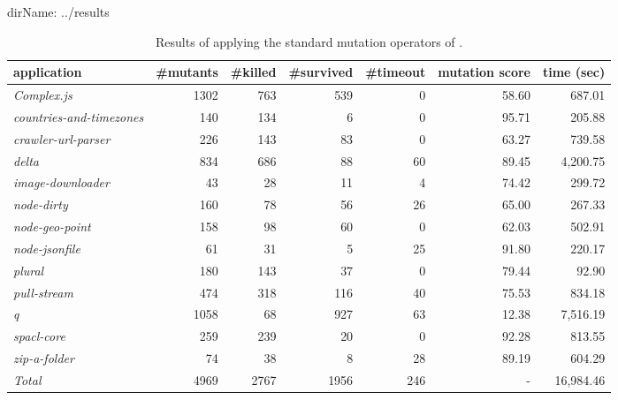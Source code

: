 dirName: ../results
\begin{table*}
 \centering
 {\scriptsize
 \begin{tabular}{l||r|r|r|r|r|r}
   {\bf application} & {\bf \#mutants} & {\bf \#killed} & {\bf \#survived} & {\bf \#timeout} & {\bf mutation score} & {\bf time (sec)}\\
   \hline
   \textit{Complex.js} & 1302 & 763 & 539 & 0 & 58.60 & 687.01 \\ 
   \hline
   \textit{countries-and-timezones} & 140 & 134 & 6 & 0 & 95.71 & 205.88 \\ 
   \hline
   \textit{crawler-url-parser} & 226 & 143 & 83 & 0 & 63.27 & 739.58 \\ 
   \hline
   \textit{delta} & 834 & 686 & 88 & 60 & 89.45 & 4,200.75 \\ 
   \hline
   \textit{image-downloader} & 43 & 28 & 11 & 4 & 74.42 & 299.72 \\ 
   \hline
   \textit{node-dirty} & 160 & 78 & 56 & 26 & 65.00 & 267.33 \\ 
   \hline
   \textit{node-geo-point} & 158 & 98 & 60 & 0 & 62.03 & 502.91 \\ 
   \hline
   \textit{node-jsonfile} & 61 & 31 & 5 & 25 & 91.80 & 220.17 \\ 
   \hline
   \textit{plural} & 180 & 143 & 37 & 0 & 79.44 & 92.90 \\ 
   \hline
   \textit{pull-stream} & 474 & 318 & 116 & 40 & 75.53 & 834.18 \\ 
   \hline
   \textit{q} & 1058 & 68 & 927 & 63 & 12.38 & 7,516.19 \\ 
   \hline
   \textit{spacl-core} & 259 & 239 & 20 & 0 & 92.28 & 813.55 \\ 
   \hline
   \textit{zip-a-folder} & 74 & 38 & 8 & 28 & 89.19 & 604.29 \\ 
   \hline
   \textit{Total} & 4969 & 2767 & 1956 & 246 & - & 16,984.46 \\ 
 \end{tabular}
 }
 \caption{Results of applying the standard mutation operators of \StrykerJS.
 }
\end{table*}

